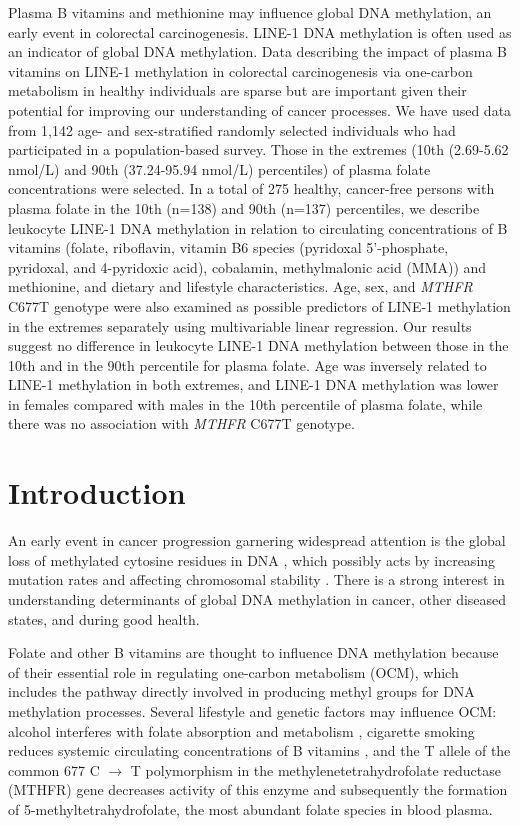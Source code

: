 \noindent Plasma B vitamins and methionine may influence global DNA methylation, an early event in colorectal carcinogenesis. LINE-1 DNA methylation is often used as an indicator of global DNA methylation. Data describing the impact of plasma B vitamins on LINE-1 methylation in colorectal carcinogenesis via one-carbon metabolism in healthy individuals are sparse but are important given their potential for improving our understanding of cancer processes. We have used data from 1,142 age- and sex-stratified randomly selected individuals who had participated in a population-based survey. Those in the extremes (10th (2.69-5.62 nmol/L) and 90th (37.24-95.94 nmol/L) percentiles) of plasma folate concentrations were selected. In a total of 275 healthy, cancer-free persons with plasma folate in the 10th (n=138) and 90th (n=137) percentiles, we describe leukocyte LINE-1 DNA methylation in relation to circulating concentrations of B vitamins (folate, riboflavin, vitamin B6 species (pyridoxal 5'-phosphate, pyridoxal, and 4-pyridoxic acid), cobalamin, methylmalonic acid (MMA)) and methionine, and dietary and lifestyle characteristics. Age, sex, and \emph{MTHFR} C677T genotype were also examined as possible predictors of LINE-1 methylation in the extremes separately using multivariable linear regression. Our results suggest no difference in leukocyte LINE-1 DNA methylation between those in the 10th and in the 90th percentile for plasma folate. Age was inversely related to LINE-1 methylation in both extremes, and LINE-1 DNA methylation was lower in females compared with males in the 10th percentile of plasma folate, while there was no association with \emph{MTHFR} C677T genotype.

\newpage

\section{Introduction} %
\noindent An early event in cancer progression garnering widespread attention is the global loss of methylated cytosine residues in DNA \cite{c31,c32}, which possibly acts by increasing mutation rates and affecting chromosomal stability \cite{c33,c34}. There is a strong interest in understanding determinants of global DNA methylation in cancer, other diseased states, and during good health.

\noindent Folate and other B vitamins are thought to influence DNA methylation because of their essential role in regulating one-carbon metabolism (OCM), which includes the pathway directly involved in producing methyl groups for DNA methylation processes. Several lifestyle and genetic factors may influence OCM: alcohol interferes with folate absorption and metabolism \cite{c35}, cigarette smoking reduces systemic circulating concentrations of B vitamins \cite{c36}, and the T allele of the common 677 C $\rightarrow$ T polymorphism in the methylenetetrahydrofolate reductase (MTHFR) gene decreases activity of this enzyme and subsequently the formation of 5-methyltetrahydrofolate, the most abundant folate species in blood plasma.

